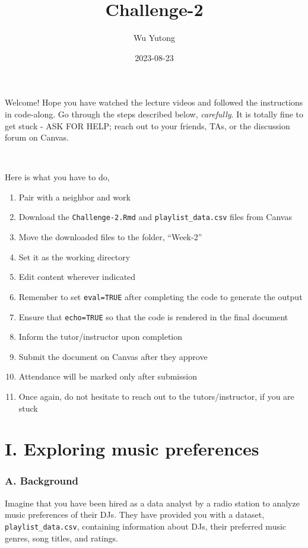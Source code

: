 \documentclass[
]{article}
\title{Challenge-2}
\author{Wu Yutong}
\date{2023-08-23}
\begin{document}
\maketitle

Welcome! Hope you have watched the lecture videos and followed the
instructions in code-along. Go through the steps described below,
\emph{carefully}. It is totally fine to get stuck - ASK FOR HELP; reach
out to your friends, TAs, or the discussion forum on Canvas.

~

Here is what you have to do,

\begin{enumerate}
\def\labelenumi{\arabic{enumi}.}
\item
  Pair with a neighbor and work
\item
  Download the \texttt{Challenge-2.Rmd} and \texttt{playlist\_data.csv}
  files from Canvas
\item
  Move the downloaded files to the folder, ``Week-2''
\item
  Set it as the working directory
\item
  Edit content wherever indicated
\item
  Remember to set \texttt{eval=TRUE} after completing the code to
  generate the output
\item
  Ensure that \texttt{echo=TRUE} so that the code is rendered in the
  final document
\item
  Inform the tutor/instructor upon completion
\item
  Submit the document on Canvas after they approve
\item
  Attendance will be marked only after submission
\item
  Once again, do not hesitate to reach out to the tutors/instructor, if
  you are stuck
\end{enumerate}

\hypertarget{i.-exploring-music-preferences}{%
\section{I. Exploring music
preferences}\label{i.-exploring-music-preferences}}

\hypertarget{a.-background}{%
\subsubsection{A. Background}\label{a.-background}}

Imagine that you have been hired as a data analyst by a radio station to
analyze music preferences of their DJs. They have provided you with a
dataset, \texttt{playlist\_data.csv}, containing information about DJs,
their preferred music genres, song titles, and ratings.
\end{document}
